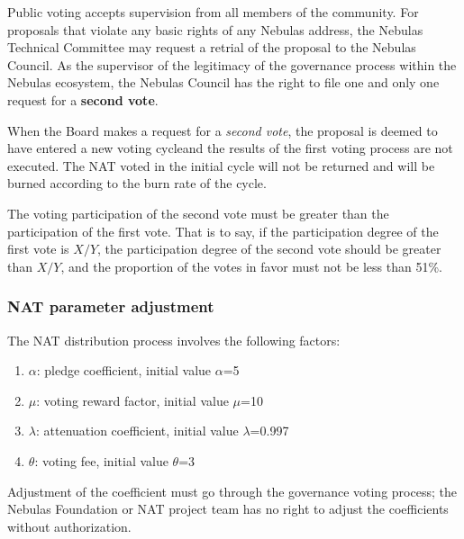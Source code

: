 Public voting accepts supervision from all members of the community. For proposals that violate any basic rights of any Nebulas address, the Nebulas Technical Committee may request a retrial of the proposal to the Nebulas Council. As the supervisor of the legitimacy of the governance process within the Nebulas ecosystem, the Nebulas Council has the right to file one and only one request for a \textbf{second vote}.

When the Board makes a request for a \emph{second vote}, the proposal is deemed to have entered a new voting cycleand the results of the first voting process are not executed. The NAT voted in the initial cycle will not be returned and will be burned according to the burn rate of the cycle.

The voting participation of the second vote must be greater than the
participation of the first vote. That is to say, if the participation degree of
the first vote is $X/Y$, the participation degree of the second vote should be
greater than $X/Y$, and the proportion of the votes in favor must not be less than 51\%.

\subsubsection{NAT parameter adjustment}

The NAT distribution process involves the following factors:

\begin{enumerate}
	\item $\alpha$: pledge coefficient, initial value $\alpha$=5
	\item $\mu$: voting reward factor, initial value $\mu$=10
	\item $\lambda$: attenuation coefficient, initial value $\lambda$=0.997
	\item $\theta$: voting fee, initial value $\theta$=3
\end{enumerate}

Adjustment of the coefficient must go through the governance voting process; the Nebulas Foundation or NAT project team has no right to adjust the coefficients without authorization.

